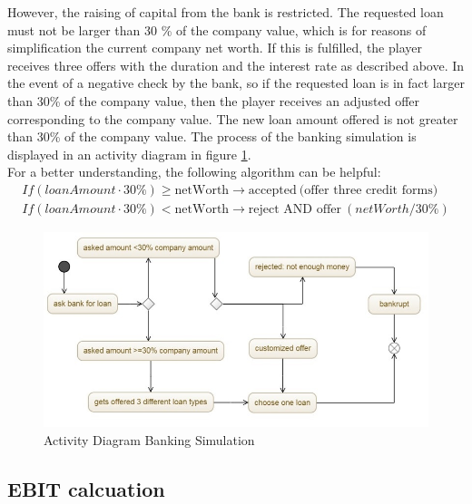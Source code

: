 
However, the raising of capital from the bank is restricted.
The requested loan must not be larger than 30 \% of the company value, which is for reasons of simplification the current company net worth. If this is fulfilled, the player receives three offers with the duration and the interest rate as described above. In the event of a negative check by the bank, so if the requested loan is in fact larger than 30\% of the company value, then the player receives an adjusted offer corresponding to the company value. The new loan amount offered is not greater than 30\% of the company value. The process of the banking simulation is displayed in an activity diagram in figure \ref{jpg:banking}.\\
For a better understanding, the following algorithm can be helpful:
\begin{equation}
\begin{aligned}
If (loanAmount \cdot 30\% ) \geq  \text{netWorth} \xrightarrow{} \text{accepted} \ \text{(offer three credit forms)} \\
If (loanAmount \cdot 30\%) < \text{netWorth} \xrightarrow{} \text{reject AND offer} \ (netWorth / 30\%)
\end{aligned}    
\end{equation}

\begin{figure}
	\centering
	\includegraphics[width=12cm]{images/banking_activity_diagram.jpg}
	\caption{Activity Diagram Banking Simulation}
	\label{jpg:banking}
\end{figure}

\subsection{EBIT calcuation}

